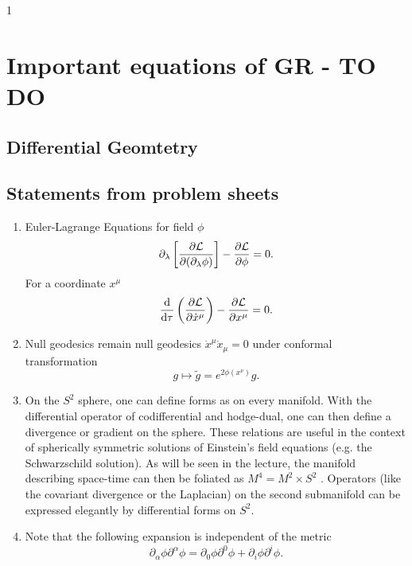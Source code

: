 1 








\chapter{Important equations of GR - TO DO}
\section{Differential Geomtetry}

\section{Statements from problem sheets}
\begin{enumerate}
\item Euler-Lagrange Equations for field $\phi$
\begin{equation}
	\partial_\lambda \left[\frac{\partial \mathcal{L}}{\partial(\partial_\lambda \phi)}\right] - \frac{\partial \mathcal{L}}{\partial \phi} =0.
\end{equation}
For a coordinate $x^\mu$
\begin{equation}
	\frac{\mathrm{d}}{\mathrm{d} \tau} \left(\frac{\partial \mathcal{L}}{\partial \dot{x}^\mu}\right) - \frac{\partial \mathcal{L}}{\partial x^\mu}=0.
\end{equation}
\item Null geodesics remain null geodesics $\dot{x}^\mu \dot{x}_\mu=0$ under conformal transformation
\begin{equation}
	g \mapsto \tilde{g} = e^{2 \phi(x^\nu) } g.
\end{equation}
\item On the $S^2$ sphere, one can define forms as on every manifold. With the differential operator of codifferential and hodge-dual, one can then define a divergence or gradient on the sphere. These relations are useful in the
context of spherically symmetric solutions of Einstein’s field equations (e.g. the Schwarzschild
solution). As will be seen in the lecture, the manifold describing space-time can then be foliated
as $M^4 = M^2 × S^2$ . Operators (like the covariant divergence or the Laplacian) on the second
submanifold can be expressed elegantly by differential forms on $S^2$.
\item Note that the following expansion is independent of the metric
\begin{equation}
	\partial_\alpha \phi \partial^\alpha \phi = \partial_0 \phi \partial^0 \phi + \partial_i \phi \partial^i \phi.

\end{equation}
\end{enumerate}
